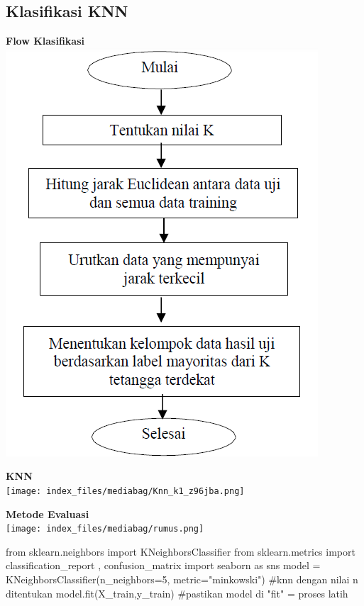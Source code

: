 \documentclass[
  letterpaper,
  DIV=11,
  numbers=noendperiod]{scrreprt}
\newenvironment{Shaded}{\begin{snugshade}}{\end{snugshade}}
\newcommand{\CommentTok}[1]{\textcolor[rgb]{0.37,0.37,0.37}{#1}}
\newcommand{\DecValTok}[1]{\textcolor[rgb]{0.68,0.00,0.00}{#1}}
\newcommand{\ImportTok}[1]{\textcolor[rgb]{0.00,0.46,0.62}{#1}}
\newcommand{\NormalTok}[1]{\textcolor[rgb]{0.00,0.23,0.31}{#1}}
\newcommand{\OperatorTok}[1]{\textcolor[rgb]{0.37,0.37,0.37}{#1}}
\newcommand{\StringTok}[1]{\textcolor[rgb]{0.13,0.47,0.30}{#1}}
\begin{document}
\hypertarget{klasifikasi-knn}{%
\subsection*{Klasifikasi KNN}\label{klasifikasi-knn}}

\textbf{Flow Klasifikasi}\\

\includegraphics{Asset/knnflow.png}

\textbf{KNN}\\

\texttt{[image: index\_files/mediabag/Knn\_k1\_z96jba.png]}

\textbf{Metode Evaluasi}\\

\texttt{[image: index\_files/mediabag/rumus.png]}

\begin{Shaded}
\begin{Highlighting}[]
\ImportTok{from}\NormalTok{ sklearn.neighbors }\ImportTok{import}\NormalTok{ KNeighborsClassifier}
\ImportTok{from}\NormalTok{ sklearn.metrics }\ImportTok{import}\NormalTok{ classification\_report , confusion\_matrix}
\ImportTok{import}\NormalTok{ seaborn }\ImportTok{as}\NormalTok{ sns}
\NormalTok{model }\OperatorTok{=}\NormalTok{ KNeighborsClassifier(n\_neighbors}\OperatorTok{=}\DecValTok{5}\NormalTok{, metric}\OperatorTok{=}\StringTok{"minkowski"}\NormalTok{) }\CommentTok{\#knn dengan nilai n ditentukan}
\NormalTok{model.fit(X\_train,y\_train) }\CommentTok{\#pastikan model di "fit" = proses latih}
\end{Highlighting}
\end{Shaded}
\end{document}

